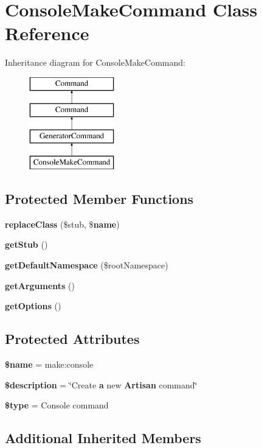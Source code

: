 \section{Console\+Make\+Command Class Reference}
\label{class_illuminate_1_1_foundation_1_1_console_1_1_console_make_command}
Inheritance diagram for Console\+Make\+Command\+:\begin{figure}[H]
\begin{center}
\leavevmode
\includegraphics[height=4.000000cm]{class_illuminate_1_1_foundation_1_1_console_1_1_console_make_command}
\end{center}
\end{figure}
\subsection*{Protected Member Functions}
\begin{DoxyCompactItemize}
\item 
{\bf replace\+Class} (\$stub, \${\bf name})
\item 
{\bf get\+Stub} ()
\item 
{\bf get\+Default\+Namespace} (\$root\+Namespace)
\item 
{\bf get\+Arguments} ()
\item 
{\bf get\+Options} ()
\end{DoxyCompactItemize}
\subsection*{Protected Attributes}
\begin{DoxyCompactItemize}
\item 
{\bf \$name} = \textquotesingle{}make\+:console\textquotesingle{}
\item 
{\bf \$description} = \char`\"{}Create {\bf a} new {\bf Artisan} command\char`\"{}
\item 
{\bf \$type} = \textquotesingle{}Console command\textquotesingle{}
\end{DoxyCompactItemize}
\subsection*{Additional Inherited Members}


